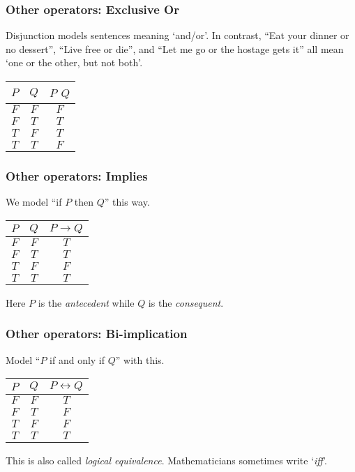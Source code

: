 \documentclass[10pt,t]{beamer}
\begin{document}
\begin{frame}
  \frametitle{Other operators: Exclusive Or}

Disjunction models
sentences meaning `and/or'.
In contrast,
``Eat your dinner or no dessert'',
``Live free or die'', and
``Let me go or the hostage gets it'' all mean `one or the other, but not both'.
\begin{center}
  \begin{tabular}{cc|c}
    $P$  &$Q$  &$P$ \text{\small\textsc{XOR}} $Q$  \\ \hline
    $F$  &$F$  &$F$          \\
    $F$  &$T$  &$T$          \\
    $T$  &$F$  &$T$          \\
    $T$  &$T$  &$F$     
  \end{tabular}
\end{center}
\end{frame}




\begin{frame}
  \frametitle{Other operators: Implies}

We model ``if $P$ then $Q$'' this way.
\begin{center}
  \begin{tabular}{cc|c}
    $P$  &$Q$  &$P \rightarrow Q$  \\ \hline
    $F$  &$F$  &$T$          \\
    $F$  &$T$  &$T$          \\
    $T$  &$F$  &$F$          \\
    $T$  &$T$  &$T$     
  \end{tabular}
\end{center}
Here $P$ is the \emph{antecedent} while $Q$ is the 
\emph{consequent}. 
\end{frame}




\begin{frame}
  \frametitle{Other operators: Bi-implication}

Model ``$P$ if and only if $Q$'' with this.
\begin{center}
  \begin{tabular}{cc|c}
    $P$  &$Q$  &$P \leftrightarrow Q$  \\ \hline
    $F$  &$F$  &$T$          \\
    $F$  &$T$  &$F$          \\
    $T$  &$F$  &$F$          \\
    $T$  &$T$  &$T$     
  \end{tabular}
\end{center}
This is also called \emph{logical equivalence}.
Mathematicians sometimes write `\emph{iff}'.
\end{frame}
\end{document}
